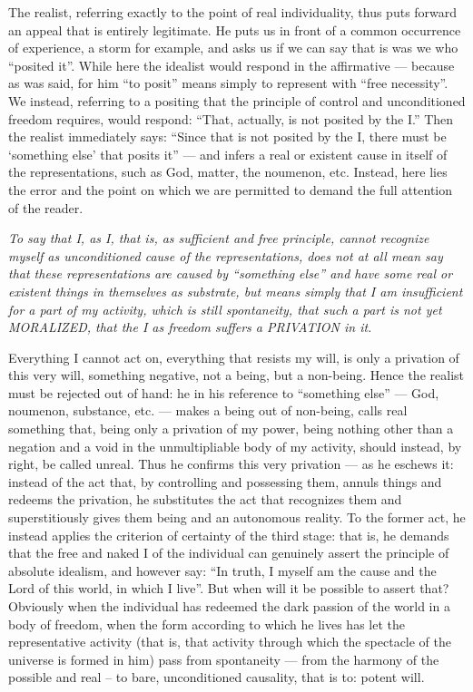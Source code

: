 \begin{quotex}
The realist, referring exactly to the point of real individuality, thus puts forward an appeal that is entirely legitimate. He puts us in front of a common occurrence of experience, a storm for example, and asks us if we can say that is was we who ``posited it''. While here the idealist would respond in the affirmative --- because as was said, for him ``to posit'' means simply to represent with ``free necessity''. We instead, referring to a positing that the principle of control and unconditioned freedom requires, would respond: ``That, actually, is not posited by the I.'' Then the realist immediately says: ``Since that is not posited by the I, there must be `something else' that posits it'' --- and infers a real or existent cause in itself of the representations, such as God, matter, the noumenon, etc. Instead, here lies the error and the point on which we are permitted to demand the full attention of the reader.

\emph{To say that I, as I, that is, as sufficient and free principle, cannot recognize myself as unconditioned cause of the representations, does not at all mean say that these representations are caused by ``something else'' and have some real or existent things in themselves as substrate, but means simply that I am insufficient for a part of my activity, which is still spontaneity, that such a part is not yet MORALIZED, that the I as freedom suffers a PRIVATION in it.}

Everything I cannot act on, everything that resists my will, is only a privation of this very will, something negative, not a being, but a non-being. Hence the realist must be rejected out of hand: he in his reference to ``something else'' --- God, noumenon, substance, etc. --- makes a being out of non-being, calls real something that, being only a privation of my power, being nothing other than a negation and a void in the unmultipliable body of my activity, should instead, by right, be called unreal. Thus he confirms this very privation --- as he eschews it: instead of the act that, by controlling and possessing them, annuls things and redeems the privation, he substitutes the act that recognizes them and superstitiously gives them being and an autonomous reality. To the former act, he instead applies the criterion of certainty of the third stage: that is, he demands that the free and naked I of the individual can genuinely assert the principle of absolute idealism, and however say: ``In truth, I myself am the cause and the Lord of this world, in which I live''. But when will it be possible to assert that? Obviously when the individual has redeemed the dark passion of the world in a body of freedom, when the form according to which he lives has let the representative activity (that is, that activity through which the spectacle of the universe is formed in him) pass from spontaneity --- from the harmony of the possible and real -- to bare, unconditioned causality, that is to: potent will.
\end{quotex}



